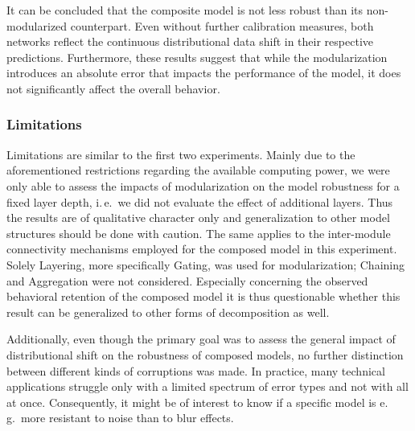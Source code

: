 It can be concluded that the composite model is not less robust than its non-modularized counterpart. Even without further calibration measures, both networks reflect the continuous distributional data shift in their respective predictions. Furthermore, these results suggest that while the modularization introduces an absolute error that impacts the performance of the model, it does not significantly affect the overall behavior.
               
\subsubsection{Limitations%
               \label{sec:experiments_uncertainty_limitations}}
            
Limitations are similar to the first two experiments. Mainly due to the aforementioned restrictions regarding the available computing power, we were only able to assess the impacts of modularization on the model robustness for a fixed layer depth, i.\,e.\ we did not evaluate the effect of additional layers. Thus the results are of qualitative character only and generalization to other model structures should be done with caution. The same applies to the inter-module connectivity mechanisms employed for the composed model in this experiment. Solely Layering, more specifically Gating, was used for modularization; Chaining and Aggregation were not considered. Especially concerning the observed behavioral retention of the composed model it is thus questionable whether this result can be generalized to other forms of decomposition as well.

Additionally, even though the primary goal was to assess the general impact of distributional shift on the robustness of composed models, no further distinction between different kinds of corruptions was made. In practice, many technical applications struggle only with a limited spectrum of error types and not with all at once. Consequently, it might be of interest to know if a specific model is e.\,g.\ more resistant to noise than to blur effects.

\pagebreak

